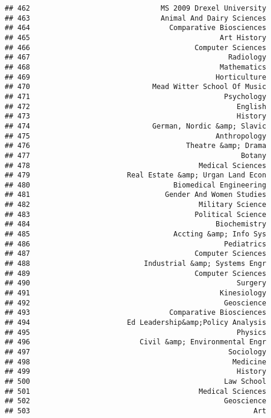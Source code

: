 \documentclass[
]{article}
\begin{document}
\begin{verbatim}
## 462                               MS 2009 Drexel University
## 463                               Animal And Dairy Sciences
## 464                                 Comparative Biosciences
## 465                                             Art History
## 466                                       Computer Sciences
## 467                                               Radiology
## 468                                             Mathematics
## 469                                            Horticulture
## 470                             Mead Witter School Of Music
## 471                                              Psychology
## 472                                                 English
## 473                                                 History
## 474                             German, Nordic &amp; Slavic
## 475                                            Anthropology
## 476                                     Theatre &amp; Drama
## 477                                                  Botany
## 478                                        Medical Sciences
## 479                       Real Estate &amp; Urgan Land Econ
## 480                                  Biomedical Engineering
## 481                                Gender And Women Studies
## 482                                        Military Science
## 483                                       Political Science
## 484                                            Biochemistry
## 485                                  Accting &amp; Info Sys
## 486                                              Pediatrics
## 487                                       Computer Sciences
## 488                           Industrial &amp; Systems Engr
## 489                                       Computer Sciences
## 490                                                 Surgery
## 491                                             Kinesiology
## 492                                              Geoscience
## 493                                 Comparative Biosciences
## 494                       Ed Leadership&amp;Policy Analysis
## 495                                                 Physics
## 496                          Civil &amp; Environmental Engr
## 497                                               Sociology
## 498                                                Medicine
## 499                                                 History
## 500                                              Law School
## 501                                        Medical Sciences
## 502                                              Geoscience
## 503                                                     Art

\end{verbatim}
\end{document}
